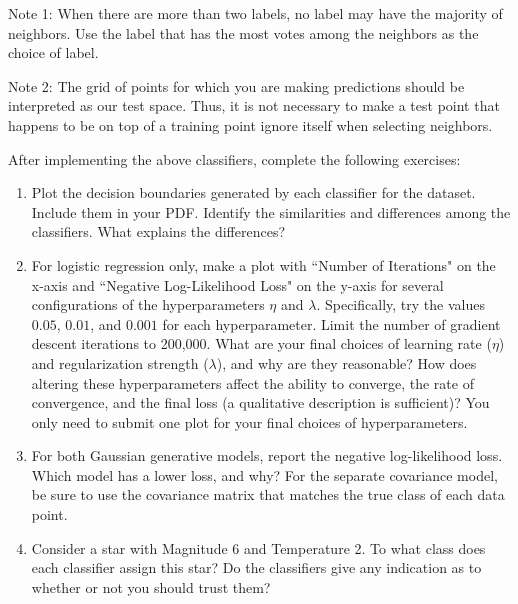 \documentclass[submit]{harvardml}
\begin{document}
\begin{problem}
\begin{enumerate}[label=\alph*)]
  Note 1: When there are more than two labels, no label may have the
  majority of neighbors.  Use the label that has the most votes among
  the neighbors as the choice of label. 

  Note 2: The grid of points for which you are making predictions
  should be interpreted as our test space.  Thus, it is not necessary
  to make a test point that happens to be on top of a training point
  ignore itself when selecting neighbors.

\end{enumerate}

After implementing the above classifiers, complete the following exercises:

\begin{enumerate}
    \item Plot the decision boundaries generated by each classifier for the dataset. Include them in your PDF. 
    Identify the similarities and differences among the classifiers. What explains the differences?
    
    \item For logistic regression only,  make a plot with
      ``Number of Iterations" on the x-axis and ``Negative Log-Likelihood Loss" on the y-axis for several
      configurations of the hyperparameters $\eta$ and $\lambda$.  Specifically,  try the values $0.05$,  $0.01$,  and $0.001$ for each hyperparameter.  Limit the number of gradient descent iterations to 200,000.  What are your final choices of learning rate
      ($\eta$) and regularization strength ($\lambda$), and why are they reasonable? How
      does altering these hyperparameters affect the ability to converge,  the rate of convergence,  and the final loss (a qualitative description is sufficient)? You only need to submit one plot for your final choices of hyperparameters. 

    \item For both Gaussian generative models, report the negative log-likelihood loss. Which model has a lower loss, and why?
      For the separate covariance model, be sure to use
      the covariance matrix that matches the true class of each data
      point.
    
    \item Consider a star with Magnitude 6 and Temperature 2.
      To what class does each classifier assign this star? Do the
      classifiers give any indication as to whether or not you should
  trust them?
\end{enumerate}
\end{problem}
\end{document}
